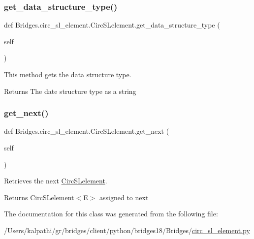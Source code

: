 \subsubsection{\texorpdfstring{get\+\_\+data\+\_\+structure\+\_\+type()}{get\_data\_structure\_type()}}
{\footnotesize\ttfamily def Bridges.\+circ\+\_\+sl\+\_\+element.\+Circ\+S\+Lelement.\+get\+\_\+data\+\_\+structure\+\_\+type (\begin{DoxyParamCaption}\item[{}]{self }\end{DoxyParamCaption})}



This method gets the data structure type. 

\begin{DoxyReturn}{Returns}
The date structure type as a string 
\end{DoxyReturn}
\mbox{\label{class_bridges_1_1circ__sl__element_1_1_circ_s_lelement_a709b68b1e016734f15c64bde94077d58}} 
\subsubsection{\texorpdfstring{get\+\_\+next()}{get\_next()}}
{\footnotesize\ttfamily def Bridges.\+circ\+\_\+sl\+\_\+element.\+Circ\+S\+Lelement.\+get\+\_\+next (\begin{DoxyParamCaption}\item[{}]{self }\end{DoxyParamCaption})}



Retrieves the next \mbox{\hyperlink{class_bridges_1_1circ__sl__element_1_1_circ_s_lelement}{Circ\+S\+Lelement}}. 

\begin{DoxyReturn}{Returns}
Circ\+S\+Lelement$<$\+E$>$ assigned to next 
\end{DoxyReturn}


The documentation for this class was generated from the following file\+:\begin{DoxyCompactItemize}
\item 
/\+Users/kalpathi/gr/bridges/client/python/bridges18/\+Bridges/\mbox{\hyperlink{circ__sl__element_8py}{circ\+\_\+sl\+\_\+element.\+py}}\end{DoxyCompactItemize}
